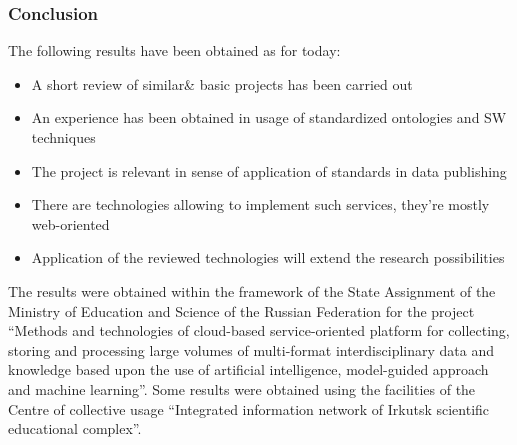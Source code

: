 \documentclass[10pt]{beamer}
\begin{document}
\begin{frame}
  \frametitle{Conclusion}
  The following results have been obtained as for today:
  \begin{itemize}
  \item A short review of similar\& basic projects has been carried out
  \item An experience has been obtained in usage of standardized ontologies and SW techniques
  \item The project is relevant in sense of application of standards in data publishing
  \item There are technologies allowing to implement such services, they're mostly web-oriented
  \item Application of the reviewed technologies will extend the research possibilities
  \end{itemize}
  The results were obtained within the framework of the State Assignment of the Ministry of Education and Science of the Russian Federation for the project ``Methods and technologies of cloud-based service-oriented platform for collecting, storing and processing large volumes of multi-format interdisciplinary data and knowledge based upon the use of artificial intelligence, model-guided approach and machine learning''. Some results were obtained using the facilities of the Centre of collective usage ``Integrated information network of Irkutsk scientific educational complex''.
\end{frame}
\end{document}
